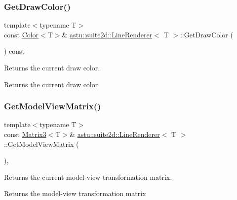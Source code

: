 \subsubsection{\texorpdfstring{Get\+Draw\+Color()}{GetDrawColor()}}
{\footnotesize\ttfamily template$<$typename T$>$ \\
const \hyperlink{classastu_1_1Color}{Color}$<$T$>$\& \hyperlink{classastu_1_1suite2d_1_1LineRenderer}{astu\+::suite2d\+::\+Line\+Renderer}$<$ T $>$\+::Get\+Draw\+Color (\begin{DoxyParamCaption}{ }\end{DoxyParamCaption}) const\hspace{0.3cm}{\ttfamily [inline]}}

Returns the current draw color.

\begin{DoxyReturn}{Returns}
the current draw color 
\end{DoxyReturn}
\mbox{\label{classastu_1_1suite2d_1_1LineRenderer_a7e69f2a618bd4b471236cefc153f54e6}} 
\subsubsection{\texorpdfstring{Get\+Model\+View\+Matrix()}{GetModelViewMatrix()}}
{\footnotesize\ttfamily template$<$typename T$>$ \\
const \hyperlink{classastu_1_1Matrix3}{Matrix3}$<$T$>$\& \hyperlink{classastu_1_1suite2d_1_1LineRenderer}{astu\+::suite2d\+::\+Line\+Renderer}$<$ T $>$\+::Get\+Model\+View\+Matrix (\begin{DoxyParamCaption}{ }\end{DoxyParamCaption})\hspace{0.3cm}{\ttfamily [inline]}, {\ttfamily [protected]}}

Returns the current model-\/view transformation matrix.

\begin{DoxyReturn}{Returns}
the model-\/view transformation matrix 
\end{DoxyReturn}
\mbox{\label{classastu_1_1suite2d_1_1LineRenderer_a3fb6b33834fd13f556be6660a9395bd9}} 
